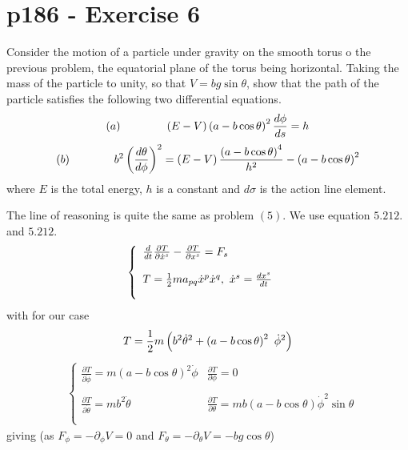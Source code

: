 \section{p186 - Exercise 6}
\begin{tcolorbox}
Consider the motion of a particle under gravity on the smooth torus o the previous problem, the equatorial plane of the torus being horizontal. Taking the mass of the particle to unity, so that $V= bg\sin{\theta}$, show that the path of the particle satisfies the following two differential equations. 
$$(a)\quad\quad\quad\quad \left(E-V\right)\left(a-b\cos\theta\right)^2\dv{\phi}{s} = h$$
$$(b)\quad\quad\quad\quad b^2\left(\dv{\theta}{\phi}\right)^2=  \left(E-V\right)\frac{\left(a-b\cos\theta\right)^4}{h^2}-\left(a-b\cos\theta\right)^2$$
where $E$ is the total energy,  $h$ is a constant and $d\sigma$ is the action line element.
\end{tcolorbox}
The line of reasoning is quite the same as problem $(5)$.
We use equation $\mathbf{5.212.}$ and  $\mathbf{5.212.}$
\begin{align}
&\left\{\begin{array}{l}
\dv{}{t}\frac{\partial T}{\partial \dot{x}^s} - \frac{\partial T}{\partial x^s} = F_{s}\\\\
T = \frac{1}{2} m a_{pq}\dot{x}^p\dot{x}^q, \ \dot{x}^s=\dv{x^s}{t}\\\\
\end{array}\right.
\end{align}
with for our case
\begin{align}
T = \half m \left(b^2\dot{\theta}^2+ \left(a-b\cos \theta \right)^2  \ \dot{\phi}^2 \right)
\end{align}
\begin{align}
&\left\{\begin{array}{ll}
\frac{\partial T}{\partial \dot{\phi}}= m \left(a-b\cos \theta \right)^2   \dot{\phi}&\frac{\partial T}{\partial {\phi}}= 0\\\\
\frac{\partial T}{\partial \dot{\theta}}=  mb^2\dot{\theta}&\frac{\partial T}{\partial {\theta}}=  mb\left(a-b\cos \theta \right)\dot{\phi}^2\sin \theta\\\\
\end{array}\right.
\end{align}giving (as $F_{\phi} = -\partial_{\phi} V = 0$ and $F_{\theta} = -\partial_{\theta} V = -bg\cos{\theta}$)
